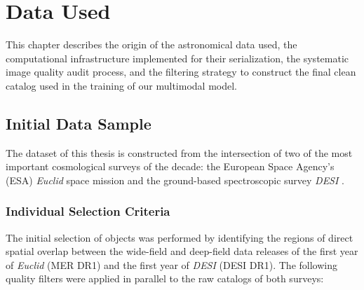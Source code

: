 
\section{Data Used} \label{sec:dat}

This chapter describes the origin of the astronomical data used, the computational infrastructure implemented for their serialization, the systematic image quality audit process, and the filtering strategy to construct the final clean catalog used in the training of our multimodal model.

\subsection{Initial Data Sample}

The dataset of this thesis is constructed from the intersection of two of the most important cosmological surveys of the decade: the European Space Agency's (ESA) \textit{Euclid} space mission \autocite{ar:mellier-2024} and the ground-based spectroscopic survey \textit{\gls{DESI}} \autocite{ar:desi-early-release}.

\subsubsection{Individual Selection Criteria}

The initial selection of objects was performed by identifying the regions of direct spatial overlap between the wide-field and deep-field data releases of the first year of \textit{Euclid} (MER DR1) and the first year of \textit{\gls{DESI}} (DESI DR1). The following quality filters were applied in parallel to the raw catalogs of both surveys:

